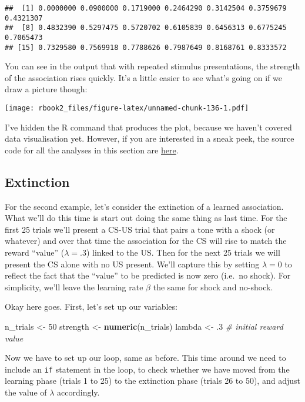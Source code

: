 \documentclass[]{book}
\newenvironment{Shaded}{\begin{snugshade}}{\end{snugshade}}
\newcommand{\CommentTok}[1]{\textcolor[rgb]{0.56,0.35,0.01}{\textit{#1}}}
\newcommand{\DecValTok}[1]{\textcolor[rgb]{0.00,0.00,0.81}{#1}}
\newcommand{\FloatTok}[1]{\textcolor[rgb]{0.00,0.00,0.81}{#1}}
\newcommand{\KeywordTok}[1]{\textcolor[rgb]{0.13,0.29,0.53}{\textbf{#1}}}
\newcommand{\NormalTok}[1]{#1}
\newcommand{\StringTok}[1]{\textcolor[rgb]{0.31,0.60,0.02}{#1}}
\begin{document}
\begin{verbatim}
##  [1] 0.0000000 0.0900000 0.1719000 0.2464290 0.3142504 0.3759679 0.4321307
##  [8] 0.4832390 0.5297475 0.5720702 0.6105839 0.6456313 0.6775245 0.7065473
## [15] 0.7329580 0.7569918 0.7788626 0.7987649 0.8168761 0.8333572
\end{verbatim}

You can see in the output that with repeated stimulus presentations, the strength of the association rises quickly. It's a little easier to see what's going on if we draw a picture though:

\texttt{[image: rbook2\_files/figure-latex/unnamed-chunk-136-1.pdf]}

I've hidden the R command that produces the plot, because we haven't covered data visualisation yet. However, if you are interested in a sneak peek, the source code for all the analyses in this section are \href{./scripts/rescorla_wagner.R}{here}.

\hypertarget{extinction}{%
\subsection{Extinction}\label{extinction}}

For the second example, let's consider the extinction of a learned association. What we'll do this time is start out doing the same thing as last time. For the first 25 trials we'll present a CS-US trial that pairs a tone with a shock (or whatever) and over that time the association for the CS will rise to match the reward ``value'' (\(\lambda = .3\)) linked to the US. Then for the next 25 trials we will present the CS alone with no US present. We'll capture this by setting \(\lambda = 0\) to reflect the fact that the ``value'' to be predicted is now zero (i.e.~no shock). For simplicity, we'll leave the learning rate \(\beta\) the same for shock and no-shock.

Okay here goes. First, let's set up our variables:

\begin{Shaded}
\begin{Highlighting}[]
\NormalTok{n_trials <-}\StringTok{ }\DecValTok{50}                
\NormalTok{strength <-}\StringTok{ }\KeywordTok{numeric}\NormalTok{(n_trials) }
\NormalTok{lambda <-}\StringTok{ }\FloatTok{.3} \CommentTok{# initial reward value }
\end{Highlighting}
\end{Shaded}

Now we have to set up our loop, same as before. This time around we need to include an \texttt{if} statement in the loop, to check whether we have moved from the learning phase (trials 1 to 25) to the extinction phase (trials 26 to 50), and adjust the value of \(\lambda\) accordingly.
\end{document}
